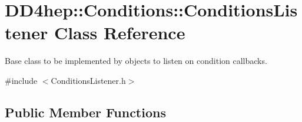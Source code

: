 \hypertarget{class_d_d4hep_1_1_conditions_1_1_conditions_listener}{}\section{D\+D4hep\+:\+:Conditions\+:\+:Conditions\+Listener Class Reference}
\label{class_d_d4hep_1_1_conditions_1_1_conditions_listener}


Base class to be implemented by objects to listen on condition callbacks.  




{\ttfamily \#include $<$Conditions\+Listener.\+h$>$}

\subsection*{Public Member Functions}
